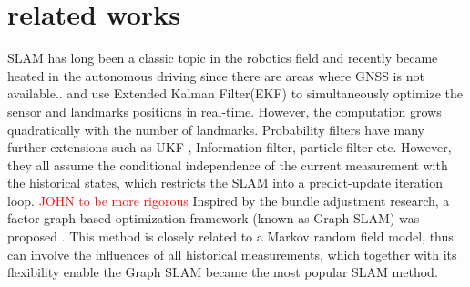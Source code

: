 \documentclass[journal]{IEEEtran}
\newcommand{\COMMENT}[1]{\textcolor{red}{#1}}
\begin{document}
\section{related works}
SLAM has long been a classic topic in the robotics field\citep{Cadena:2016fp} and recently became heated in the autonomous driving since there are areas where GNSS is not available.\citep{Bansal2015Analysis}. 
\citet{Davison2003Real} \citet{Davison2007MonoSLAM} and \citet{Civera20101} use Extended Kalman Filter(EKF) to simultaneously optimize the sensor and landmarks positions in real-time. 
However, the computation grows quadratically with the number of landmarks\cite{Bailey2006Simultaneous}.
Probability filters have many further extensions such as UKF \citep{martinez2005unscented}, Information filter\citep{thrun2005multi}, particle filter\citep{montemerlo2007fastslam}\citep{montemerlo2002fastslam} etc.
However, they all assume the conditional independence of the current measurement with the historical states, which restricts the SLAM into a predict-update iteration loop.
\COMMENT{JOHN to be more rigorous}
Inspired by the bundle adjustment research\citep{Bundle Ajustment A Modern Synthesis}, a factor graph based optimization framework (known as Graph SLAM) was proposed \citep{Thrun2006The}.
This method is closely related to a Markov random field model, thus can involve the influences of all historical measurements, which together with its flexibility enable the Graph SLAM became the most popular SLAM method\citep{why filters}.  

\end{document}
